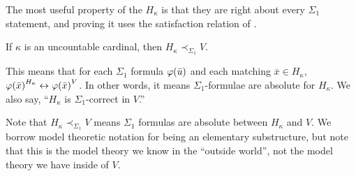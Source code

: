 The most useful property of the $H_{\kappa}$ is that they are right about every $\Sigma_1$ statement, and proving it uses the satisfaction relation of .

\begin{boxtheorem} \label{Ch3:Thm:H_Kappa_Sigma1}
    If $\kappa$ is an uncountable cardinal, then $H_{\kappa} \prec_{\Sigma_1} V$.
\end{boxtheorem}

\begin{remark}
    This means that for each $\Sigma_1$ formula $\varphi\!\left( \bar{u} \right)$ and each matching $\bar{x} \in H_{\kappa}$, $\varphi\!\left( \bar{x} \right)^{H_{\kappa}} \leftrightarrow \varphi\!\left( \bar{x} \right)^V$. In other words, it means $\Sigma_1$-formulae are absolute for $H_{\kappa}$. We also say, ``$H_{\kappa}$ is $\Sigma_1$-correct in $V$.''
\end{remark}

Note that $H_{\kappa} \prec_{\Sigma_1} V$ means $\Sigma_1$ formulas are absolute between $H_{\kappa}$ and $V$. We borrow model theoretic notation for being an elementary substructure, but note that this is the model theory we know in the ``outside world'', not the model theory we have inside of $V$.

